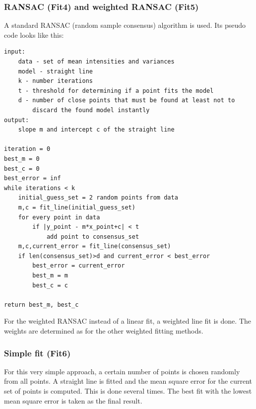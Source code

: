 \subsubsection*{RANSAC (Fit4) and weighted RANSAC (Fit5)}\label{ransacdescr}
A standard RANSAC (random sample consensus) algorithm is used. Its pseudo code looks like this:
\begin{verbatim}
input:
    data - set of mean intensities and variances
    model - straight line 
    k - number iterations
    t - threshold for determining if a point fits the model
    d - number of close points that must be found at least not to 
        discard the found model instantly
output:
    slope m and intercept c of the straight line

iteration = 0
best_m = 0
best_c = 0
best_error = inf
while iterations < k
    initial_guess_set = 2 random points from data
    m,c = fit_line(initial_guess_set)
    for every point in data
        if |y_point - m*x_point+c| < t
            add point to consensus_set
    m,c,current_error = fit_line(consensus_set)
    if len(consensus_set)>d and current_error < best_error
        best_error = current_error
        best_m = m
        best_c = c

return best_m, best_c
\end{verbatim}
For the weighted RANSAC instead of a linear fit, a weighted line fit is done. The weights are determined as for the other weighted fitting methods.
\subsubsection*{Simple fit (Fit6)}
For this very simple approach, a certain number of points is chosen randomly from all points. A straight line is fitted and the mean square error for the current set of points is computed. This is done several times. The best fit with the lowest mean square error is taken as the final result.


